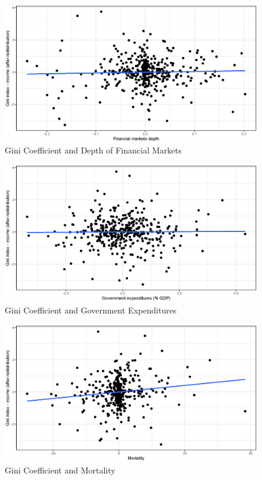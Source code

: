 \documentclass[a4paper,11pt]{article}
\begin{document}
\begin{figure}
    \caption{Gini Coefficient and Depth of Financial Markets}
\includegraphics[width=\textwidth, keepaspectratio]{figures/FMDGiniNet_dm}
\end{figure}

\begin{figure}
    \caption{Gini Coefficient and Government Expenditures}
\includegraphics[width=\textwidth, keepaspectratio]{figures/GovExpGiniNet_dm}
\end{figure}

\begin{figure}
    \caption{Gini Coefficient and Mortality}
\includegraphics[width=\textwidth, keepaspectratio]{figures/MortGiniNet_dm}
\end{figure}
\end{document}
